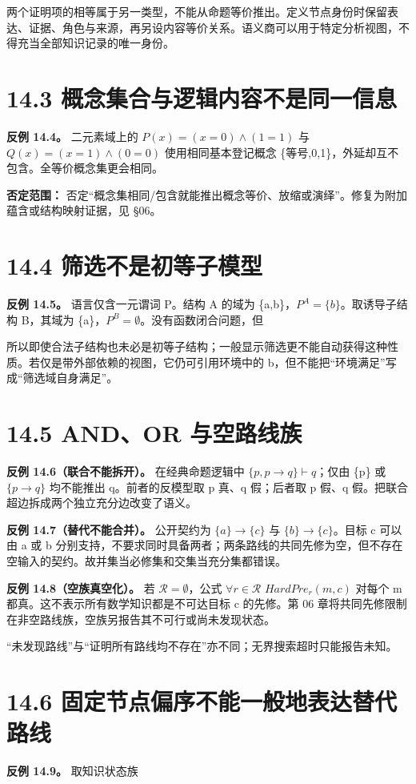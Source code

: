 \documentclass[UTF8,a4paper,zihao=-4,fontset=windows,openany]{ctexbook}
\newcommand{\mcsdisplay}[1]{%
  \par\addvspace{0.7em}%
  \sbox{\mcsmathbox}{\ensuremath{\displaystyle #1}}%
  \ifdim\wd\mcsmathbox>\linewidth
    \noindent\resizebox{\linewidth}{!}{\usebox{\mcsmathbox}}%
  \else
    \noindent\hspace*{\fill}\usebox{\mcsmathbox}\hspace*{\fill}%
  \fi
  \par\addvspace{0.7em}%
}
\def\ensuremath#1{#1}%
\def\mathrm#1{#1}%
\begin{document}
两个证明项的相等属于另一类型，不能从命题等价推出。定义节点身份时保留表达、证据、角色与来源，再另设内容等价关系。语义商可以用于特定分析视图，不得充当全部知识记录的唯一身份。

\section{14.3 概念集合与逻辑内容不是同一信息}
\textbf{反例 14.4。} 二元素域上的 \(P(x)=(x=0)\land(1=1)\) 与 \(Q(x)=(x=1)\land(0=0)\) 使用相同基本登记概念 \{等号,0,1\}，外延却互不包含。全等价概念集更会相同。

\textbf{否定范围：} 否定“概念集相同/包含就能推出概念等价、放缩或演绎”。修复为附加蕴含或结构映射证据，见 §06。

\section{14.4 筛选不是初等子模型}
\textbf{反例 14.5。} 语言仅含一元谓词 P。结构 A 的域为 \{a,b\}，\(P^A=\{b\}\)。取诱导子结构 B，其域为 \{a\}，\(P^B=\emptyset\)。没有函数闭合问题，但


\mcsdisplay{A\models\exists x\,P(x),\qquad B\not\models\exists x\,P(x).}
\noindent 所以即使合法子结构也未必是初等子结构；一般显示筛选更不能自动获得这种性质。若仅是带外部依赖的视图，它仍可引用环境中的 b，但不能把“环境满足”写成“筛选域自身满足”。

\section{14.5 AND、OR 与空路线族}
\textbf{反例 14.6（联合不能拆开）。} 在经典命题逻辑中 \(\{p,p\to q\}\vdash q\)；仅由 \{p\} 或 \(\{p\to q\}\) 均不能推出 q。前者的反模型取 p 真、q 假；后者取 p 假、q 假。把联合超边拆成两个独立充分边改变了语义。

\textbf{反例 14.7（替代不能合并）。} 公开契约为 \(\{a\}\to\{c\}\) 与 \(\{b\}\to\{c\}\)。目标 c 可以由 a 或 b 分别支持，不要求同时具备两者；两条路线的共同先修为空，但不存在空输入的契约。故并集当必修集和交集当充分集都错误。

\textbf{反例 14.8（空族真空化）。} 若 \(\mathcal{R}=\emptyset\)，公式 \(\forall r\in\mathcal{R}\) \(\mathrm{HardPre}_r(m,c)\) 对每个 m 都真。这不表示所有数学知识都是不可达目标 c 的先修。第 06 章将共同先修限制在非空路线族，空族另报告其不可行或尚未发现状态。

“未发现路线”与“证明所有路线均不存在”亦不同；无界搜索超时只能报告未知。

\section{14.6 固定节点偏序不能一般地表达替代路线}
\textbf{反例 14.9。} 取知识状态族
\end{document}
